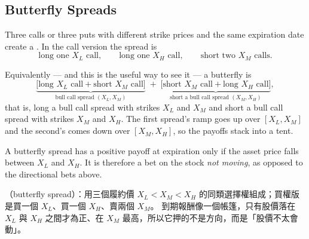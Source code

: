 \subsection{Butterfly Spreads}


Three calls or three puts with different strike prices and the same expiration date create a .
In the call version the spread is
\[
	\text{long one } X_{L}\text{ call},\qquad
	\text{long one } X_{H}\text{ call},\qquad
	\text{short two } X_{M}\text{ calls}.
\]

Equivalently --- and this is the useful way to see it --- a butterfly is
\[
	\underbrace{\bigl[\text{long } X_{L}\text{ call} + \text{short } X_{M}\text{ call}\bigr]}_{\text{bull call spread } (X_{L},X_{M})}
	\;+\;
	\underbrace{\bigl[\text{short } X_{M}\text{ call} + \text{long } X_{H}\text{ call}\bigr]}_{\text{short a bull call spread } (X_{M},X_{H})} ,
\]
that is, long a bull call spread with strikes $X_{L}$ and $X_{M}$ and short a bull call spread with strikes $X_{M}$ and $X_{H}$.
\suppstart
The first spread's ramp goes up over $[X_{L},X_{M}]$ and the second's comes down over $[X_{M},X_{H}]$, so the payoffs stack into a tent.
\suppend

A butterfly spread has a positive payoff at expiration only if the asset price falls between $X_{L}$ and $X_{H}$.
\suppstart
It is therefore a bet on the stock \emph{not moving}, as opposed to the directional bets above.

\begin{remark}
	（butterfly spread）：用三個履約價 $X_{L}<X_{M}<X_{H}$ 的同類選擇權組成；買權版是買一個 $X_{L}$、買一個 $X_{H}$、賣兩個 $X_{M}$。
	到期報酬像一個帳篷，只有股價落在 $X_{L}$ 與 $X_{H}$ 之間才為正、在 $X_{M}$ 最高，所以它押的不是方向，而是「股價不太會動」。
\end{remark}
\suppend

